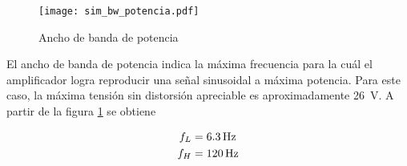 \begin{figure}[H]
	\centering
	\texttt{[image: sim\_bw\_potencia.pdf]}
	\caption{Ancho de banda de potencia}
	\label{fig:sim_bw}
\end{figure}

El ancho de banda de potencia indica la máxima frecuencia para la cuál el amplificador logra reproducir una señal sinusoidal a máxima potencia. Para este caso, la máxima tensión sin distorsión apreciable es aproximadamente \SI{26}{\volt}. A partir de la figura \ref{fig:sim_bw} se obtiene

\begin{align}
	\centering
	f_L &= \SI{6.3}{\hertz} \\
	f_H &= \SI{120}{\hertz}
\end{align}
